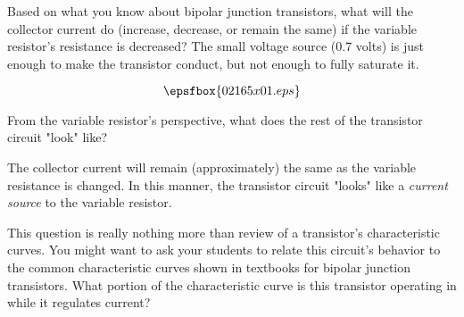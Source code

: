 

Based on what you know about bipolar junction transistors, what will the collector current do (increase, decrease, or remain the same) if the variable resistor's resistance is decreased?  The small voltage source (0.7 volts) is just enough to make the transistor conduct, but not enough to fully saturate it.

$$\epsfbox{02165x01.eps}$$

From the variable resistor's perspective, what does the rest of the transistor circuit "look" like?







The collector current will remain (approximately) the same as the variable resistance is changed.  In this manner, the transistor circuit "looks" like a {\it current source} to the variable resistor.







This question is really nothing more than review of a transistor's characteristic curves.  You might want to ask your students to relate this circuit's behavior to the common characteristic curves shown in textbooks for bipolar junction transistors.  What portion of the characteristic curve is this transistor operating in while it regulates current?




